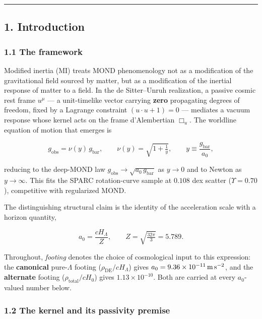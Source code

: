 \documentclass[
]{article}
\begin{document}
\begin{center}\rule{0.5\linewidth}{0.5pt}\end{center}

\subsection{1. Introduction}\label{introduction}

\subsubsection{1.1 The framework}\label{the-framework}

Modified inertia (MI) treats MOND phenomenology not as a modification of
the gravitational field sourced by matter, but as a modification of the
inertial response of matter to a field. In the de Sitter--Unruh
realization, a passive cosmic rest frame \(u^\mu\) --- a unit-timelike
vector carrying \textbf{zero} propagating degrees of freedom, fixed by a
Lagrange constraint \((u\cdot u+1)=0\) --- mediates a vacuum response
whose kernel acts on the frame d'Alembertian \(\Box_u\). The worldline
equation of motion that emerges is

\[
g_\mathrm{obs} = \nu(y)\,g_\mathrm{bar}, \qquad \nu(y)=\sqrt{1+\tfrac{1}{y}}, \qquad y \equiv \frac{g_\mathrm{bar}}{a_0},
\]

reducing to the deep-MOND law \(g_\mathrm{obs}\to\sqrt{a_0\,g_\mathrm{bar}}\)
as \(y\to 0\) and to Newton as \(y\to\infty\). This fits the SPARC
rotation-curve sample at \(0.108\) dex scatter (\(\Upsilon=0.70\)),
competitive with regularized MOND.

The distinguishing structural claim is the identity of the acceleration
scale with a horizon quantity,

\[
a_0 = \frac{cH_\Lambda}{Z}, \qquad Z=\sqrt{\tfrac{32\pi}{3}}=5.789 .
\]

Throughout, \emph{footing} denotes the choice of cosmological input to
this expression: the \textbf{canonical} pure-\(\Lambda\) footing
(\(\rho_\mathrm{DE}/cH_\Lambda\)) gives
\(a_0 = 9.36\times10^{-11}\,{\rm m\,s^{-2}}\), and the
\textbf{alternate} footing (\(\rho_\mathrm{total}/cH_0\)) gives
\(1.13\times10^{-10}\). Both are carried at every \(a_0\)-valued number
below.

\subsubsection{1.2 The kernel and its passivity
premise}\label{the-kernel-and-its-passivity-premise}
\end{document}
